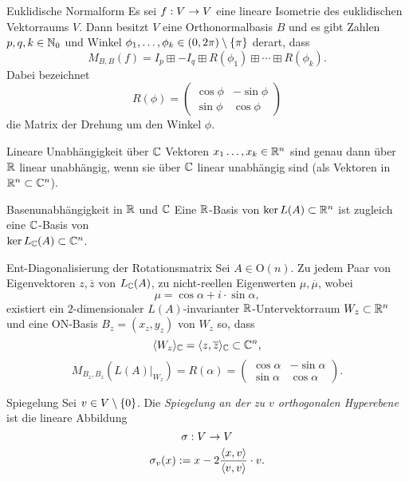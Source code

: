 \documentclass[main.tex]{subfiles}
\begin{document}
\begin{karte}{Euklidische Normalform}
    Es sei \( f : V \rightarrow V \) eine lineare 
    Isometrie des euklidischen Vektorraums \(V\). 
    Dann besitzt \(V\) eine Orthonormalbasis \(B\)
    und es gibt Zahlen \(p, q, k \in \mathbb{N}_0\) und 
    Winkel \( \phi_1,\ldots, \phi_k \in (0,2\pi)
    \setminus \{\pi\} \) derart, dass 
    \[ M_{B,B}(f) = I_p \boxplus -I_q 
    \boxplus R(\phi_1) \boxplus \cdots \boxplus R(\phi_k). \]
    Dabei bezeichnet 
    \[ R(\phi) = \begin{pmatrix}
        \cos \phi & -\sin \phi \\
        \sin \phi & \cos \phi
    \end{pmatrix} \]
    die Matrix der Drehung um den Winkel \( \phi \).
\end{karte}

\begin{karte}{Lineare Unabhängigkeit über \(\mathbb{C}\)}
    Vektoren \( x_1\ldots, x_k \in \mathbb{R}^n \) sind 
    genau dann über \( \mathbb{R} \) linear unabhängig, 
    wenn sie über \(\mathbb{C}\) linear unabhängig sind 
    (als Vektoren in \( \mathbb{R}^n \subset \mathbb{C}^n \)).
\end{karte}

\begin{karte}{Basenunabhängigkeit in \(\mathbb{R}\) und \(\mathbb{C}\)}
    Eine \(\mathbb{R}\)-Basis von \( \ker L(A) \subset \mathbb{R}^n \) 
    ist zugleich eine \( \mathbb{C} \)-Basis von \\
    \( \ker L_{\mathbb{C}} (A)\subset \mathbb{C}^n \).
\end{karte}

\begin{karte}{Ent-Diagonalisierung der Rotationsmatrix}
    Sei \(A \in \mathrm{O}(n)\). Zu jedem Paar von 
    Eigenvektoren \( z,\overline{z} \) von \( L_{\mathbb{C}}(A) \), 
    zu nicht-reellen Eigenwerten \( \mu, \overline{\mu} \), 
    wobei 
    \[ \mu = \cos \alpha + i \cdot \sin \alpha, \]
    existiert ein \(2\)-dimensionaler \( L(A) \)-invarianter 
    \( \mathbb{R} \)-Untervektorraum \( W_z \subset \mathbb{R}^n \) und 
    eine ON-Basis \( B_z = (x_z, y_z) \) von \( W_z \) 
    so, dass 
    \[ \langle W_z \rangle_{\mathbb{C}} = \langle z, \overline{z}\rangle_{\mathbb{C}} \subset \mathbb{C}^n, \]
    \[ M_{B_z,B_z}(L(A)\vert_{W_z}) = R(\alpha)
    = \begin{pmatrix}
        \cos \alpha & -\sin \alpha \\
        \sin \alpha & \cos \alpha
    \end{pmatrix}. \]
\end{karte}

\begin{karte}{Spiegelung}
    Sei \( v\in V\setminus \{0\} \). Die 
    \textit{Spiegelung an der zu \(v\) orthogonalen Hyperebene} 
    ist die lineare Abbildung 
    \[ \sigma : V \rightarrow V \]
    \[ \sigma_v(x) := x - 2\frac{\langle x, v \rangle}{\langle v, v \rangle} \cdot v. \]
\end{karte}
\end{document}
